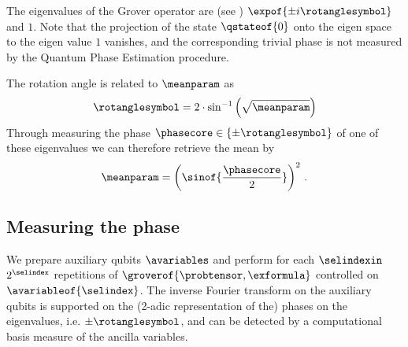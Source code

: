 
The eigenvalues of the Grover operator are (see ) $\expof{\pm i\rotanglesymbol}$ and $1$.
Note that the projection of the state $\qstateof{0}$ onto the eigen space to the eigen value $1$ vanishes, and the corresponding trivial phase is not measured by the Quantum Phase Estimation procedure.

The rotation angle is related to $\meanparam$ as
\begin{align*}
    \rotanglesymbol = 2 \cdot \sin^{-1}\left(\sqrt{\meanparam}\right)
\end{align*}
Through measuring the phase $\phasecore\in\{\pm\rotanglesymbol\}$ of one of these eigenvalues we can therefore retrieve the mean by
\begin{align*}
    \meanparam
    = \left(\sinof{\frac{\phasecore}{2}}\right)^2 \, .
\end{align*}


\subsection{Measuring the phase}


We prepare auxiliary qubits $\avariables$ and perform for each $\selindexin$ $2^{\selindex}$ repetitions of $\groverof{\probtensor,\exformula}$ controlled on $\avariableof{\selindex}$.
The inverse Fourier transform on the auxiliary qubits is supported on the (2-adic representation of the) phases on the eigenvalues, i.e. $\pm\rotanglesymbol$, and can be detected by a computational basis measure of the ancilla variables.

